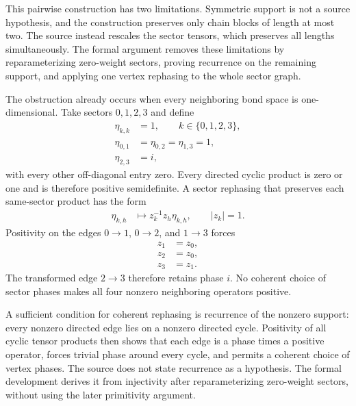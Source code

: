 \documentclass{article}
\begin{document}
This pairwise construction has two limitations. Symmetric support is not a
source hypothesis, and the construction preserves only chain blocks of length
at most two. The source instead rescales the sector tensors, which preserves
all lengths simultaneously. The formal argument removes these limitations by
reparameterizing zero-weight sectors, proving recurrence on the remaining
support, and applying one vertex rephasing to the whole sector graph.

The obstruction already occurs when every neighboring bond space is
one-dimensional. Take sectors $0,1,2,3$ and define
\begin{align}
    \eta_{k,k}
        &=1,
        \qquad k\in\{0,1,2,3\},
    \label{eq:cpgsv17_mpdo_sal_zcl_eta_local_structure_phase_obstruction_diagonal}\\
    \eta_{0,1}
        &=\eta_{0,2}
        =\eta_{1,3}
        =1,
    \label{eq:cpgsv17_mpdo_sal_zcl_eta_local_structure_phase_obstruction_real_edges}\\
    \eta_{2,3}
        &=i,
    \label{eq:cpgsv17_mpdo_sal_zcl_eta_local_structure_phase_obstruction_imaginary_edge}
\end{align}
with every other off-diagonal entry zero. Every directed cyclic product is
zero or one and is therefore positive semidefinite. A sector rephasing that
preserves each same-sector product has the form
\begin{align}
    \eta_{k,h}
        &\longmapsto
        z_k^{-1}z_h\eta_{k,h},
        \qquad |z_k|=1.
    \label{eq:cpgsv17_mpdo_sal_zcl_eta_local_structure_sector_rephasing}
\end{align}
Positivity on the edges $0\to 1$, $0\to 2$, and $1\to 3$ forces
\begin{align}
    z_1
        &=z_0,
    \label{eq:cpgsv17_mpdo_sal_zcl_eta_local_structure_phase_constraint_one}\\
    z_2
        &=z_0,
    \label{eq:cpgsv17_mpdo_sal_zcl_eta_local_structure_phase_constraint_two}\\
    z_3
        &=z_1.
    \label{eq:cpgsv17_mpdo_sal_zcl_eta_local_structure_phase_constraint_three}
\end{align}
The transformed edge $2\to 3$ therefore retains phase $i$. No coherent choice
of sector phases makes all four nonzero neighboring operators positive.

A sufficient condition for coherent rephasing is recurrence of the nonzero
support: every nonzero directed edge lies on a nonzero directed cycle.
Positivity of all cyclic tensor products then shows that each edge is a phase
times a positive operator, forces trivial phase around every cycle, and permits
a coherent choice of vertex phases. The source does not state recurrence as a
hypothesis. The formal development derives it from injectivity after
reparameterizing zero-weight sectors, without using the later primitivity
argument.
\end{document}
